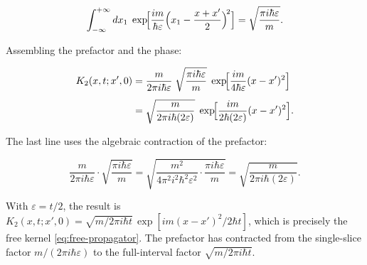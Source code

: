 \begin{linenomath}
\begin{equation*}
\int_{-\infty}^{+\infty} dx_1\;
\exp\!\Bigl[\frac{im}{\hbar\varepsilon}\Bigl(x_1 - \frac{x+x'}{2}\Bigr)^{\!2}\Bigr]
= \sqrt{\frac{\pi i\hbar\varepsilon}{m}} .
\end{equation*}
\end{linenomath}
Assembling the prefactor and the phase:
\begin{linenomath}
\begin{equation}
\begin{aligned}
K_2(x,t;x',0)
&= \frac{m}{2\pi i\hbar\varepsilon}\;
   \sqrt{\frac{\pi i\hbar\varepsilon}{m}}\;
   \exp\!\Bigl[\frac{im}{4\hbar\varepsilon}(x-x')^2\Bigr] \\[4pt]
&= \sqrt{\frac{m}{2\pi i\hbar(2\varepsilon)}}\;
   \exp\!\Bigl[\frac{im}{2\hbar(2\varepsilon)}(x-x')^2\Bigr] .
\end{aligned}
\label{eq:free-kernel-sliced-induction}
\end{equation}
\end{linenomath}
The last line uses the algebraic contraction of the prefactor:
\begin{linenomath}
\begin{equation*}
\frac{m}{2\pi i\hbar\varepsilon}\cdot\sqrt{\frac{\pi i\hbar\varepsilon}{m}}
= \sqrt{\frac{m^2}{4\pi^2 i^2\hbar^2\varepsilon^2}\cdot\frac{\pi i\hbar\varepsilon}{m}}
= \sqrt{\frac{m}{2\pi i\hbar(2\varepsilon)}} .
\end{equation*}
\end{linenomath}
With $\varepsilon = t/2$, the result is $K_2(x,t;x',0) = \sqrt{m/2\pi i\hbar t}\,\exp[im(x-x')^2/2\hbar t]$, which is precisely the free kernel \eqref{eq:free-propagator}. The prefactor has contracted from the single-slice factor $m/(2\pi i\hbar\varepsilon)$ to the full-interval factor $\sqrt{m/2\pi i\hbar t}$.

